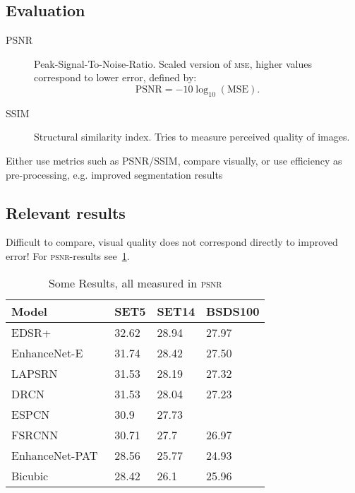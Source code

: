 \documentclass{scrartcl}
\begin{document}
\subsection{Evaluation}\label{sec:evaluation}
\begin{description}
\item[PSNR] Peak-Signal-To-Noise-Ratio. Scaled version of \textsc{mse}, higher values correspond to lower error, defined by:
  \begin{equation}
  \label{eq:psnr}
  \mathrm{PSNR} = -10 \log_{10} (\mathrm{MSE}).
\end{equation}
\item[SSIM] Structural similarity index. Tries to measure perceived quality of images.
\end{description}

Either use metrics such as PSNR/SSIM, compare visually, or use efficiency as pre-processing, e.g. improved segmentation results

\subsection{Relevant results}
Difficult to compare, visual quality does not correspond directly to improved error!
For \textsc{psnr}-results see~\cref{tab:results}.

\begin{table}[]
\centering
\caption{Some Results, all measured in \textsc{psnr}}

\label{tab:results}
\begin{tabular}{@{}llll@{}}
\toprule
Model          & SET5  & SET14 & BSDS100 \\ \midrule
EDSR+~\cite{EDSR} & 32.62 & 28.94 & 27.97 \\
EnhanceNet-E~\cite{EnhanceNet}   & 31.74 & 28.42 & 27.50   \\
LAPSRN~\cite{LapSRN}         & 31.53 & 28.19 & 27.32   \\
DRCN~\cite{DRCN}           & 31.53 & 28.04 & 27.23   \\
ESPCN~\cite{Espcn}       & 30.9  & 27.73 &         \\
FSRCNN~\cite{Fsrcnn}         & 30.71 & 27.7  & 26.97   \\
EnhanceNet-PAT~\cite{EnhanceNet} & 28.56 & 25.77 & 24.93   \\
Bicubic        & 28.42 & 26.1  & 25.96   \\ \bottomrule
\end{tabular}
\end{table}
\end{document}
